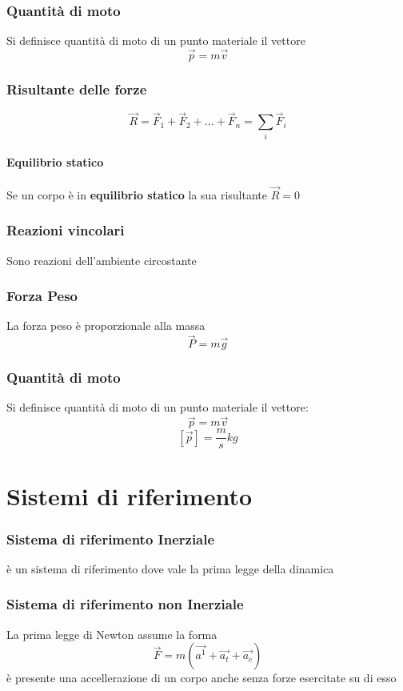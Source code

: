 \documentclass[a4paper]{report}
\begin{document}
  \subsection{Quantità di moto}
  Si definisce quantità di moto di un punto materiale il vettore
  \[ \vec{p} = m\vec{v} \]

  \subsection{Risultante delle forze}
  \[ \vec{R} = \vec{F}_1 + \vec{F}_2 + ... +\vec{F}_n = \sum_i \vec{F}_i \]

  \subsubsection{Equilibrio statico}
  Se un corpo è in \textbf{equilibrio statico} la sua risultante $\vec{R} = 0$

  \subsection{Reazioni vincolari}
  Sono reazioni dell'ambiente circostante

  \subsection{Forza Peso}
  La forza peso è proporzionale alla massa
  \[ \vec{P} = m\vec{g} \]

  \subsection{Quantità di moto}
  Si definisce quantità di moto di un punto materiale il vettore:
  \[ \vec{p} = m \vec{v} \]
  \[ [\vec{p}] = \frac{m}{s} kg \]

  \chapter{Sistemi di riferimento}
  \subsection{Sistema di riferimento Inerziale}
  è un sistema di riferimento dove vale la prima legge della dinamica
  \subsection{Sistema di riferimento non Inerziale}
  La prima legge di Newton assume la forma
  \[ \vec{F} = m(\vec{a^1} + \vec{a_t} + \vec{a_c}) \]
  è presente una accellerazione di un corpo anche senza forze esercitate su di esso
\end{document}
